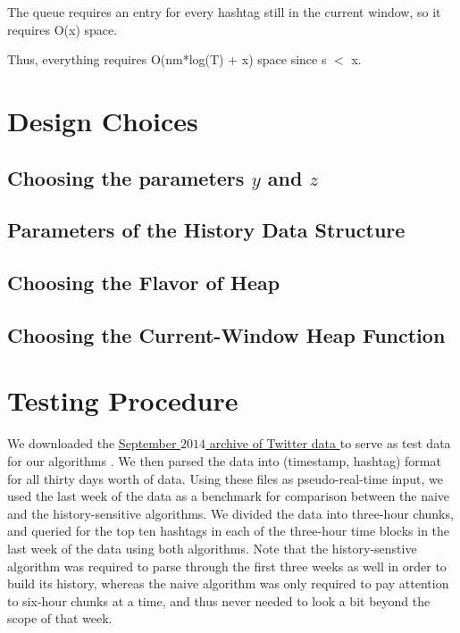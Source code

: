 \documentclass[twoside]{article}
\newcommand{\cc}[1]
 {\textbf{\cite{#1}}}
\begin{document}
The queue requires an entry for every hashtag still in the current window, so it requires O(x) space.

Thus, everything requires O(nm*log(T) + x) space since s $<$ x.


\section{Design Choices}

\subsection{Choosing the parameters $y$ and $z$}

\subsection{Parameters of the History Data Structure}

\subsection{Choosing the Flavor of Heap}

\subsection{Choosing the Current-Window Heap Function}


\section{Testing Procedure}

We downloaded the \href{https://archive.org/details/twitterstream}{September $2014$ archive of Twitter data } to serve as test data for our algorithms \cc{Twitter2014}. We then parsed the data into (timestamp, hashtag) format
for all thirty days worth of data. Using these files as pseudo-real-time input, we used the last week of the data as a benchmark for comparison between the naive and the history-sensitive algorithms. We divided the data into three-hour chunks, and queried for the top ten hashtags in each of the three-hour time blocks
in the last week of the data using both algorithms. Note that the history-senstive algorithm was required to parse through the first three weeks as well in order to build its history, whereas the naive algorithm was only required to pay attention to six-hour chunks at a time, and thus never needed to look a bit beyond the scope of that week. 
\end{document}
